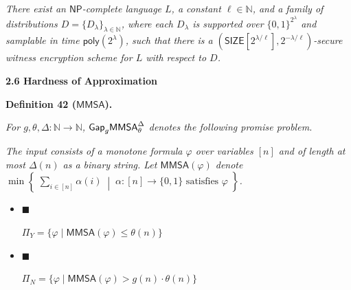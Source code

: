 \documentclass[10pt,a4paper]{article}
\begin{document}
\emph{There exist an ${\mathsf{NP}}$-complete language $L$, a constant $\ell\in\mathbb{N}$, and a family of distributions $D=\{D_{\lambda}\}_{\lambda\in\mathbb{N}}$, where each $D_{\lambda}$ is supported over $\{0,1\}^{2^{\lambda}}$ and samplable in time ${\mathsf{poly}}(2^{\lambda})$, such that there is a $({\mathsf{SIZE}}[2^{\lambda/\ell}],2^{-\lambda/\ell})$-secure witness encryption scheme for $L$ with respect to $D$.}\par







\par\medskip\noindent\textbf{
2.6 Hardness of Approximation}\par





\par\medskip\noindent\textbf{
\textbf{Definition 42}\textbf{ }(${\mathsf{MMSA}}$)\textbf{.}
}\par



\emph{For $g,\theta,\Delta:\mathbb{N}\to\mathbb{N}$, ${\sf Gap}_{g}{\mathsf{MMSA}}^{\Delta}_{\theta}$ denotes the following promise problem.}\par




\emph{The input consists of a monotone formula $\varphi$ over variables $[n]$ and of length at most $\Delta(n)$ as a binary string. Let ${\mathsf{MMSA}}(\varphi)$ denote $\min\left\{\;\sum_{i\in[n]}\alpha(i)\;\middle|\;\alpha:[n]\to\{0,1\}\text{ satisfies }\varphi\;\right\}$.}\par


\begin{itemize}


\item[] 
$\blacksquare$ 


$\Pi_{Y}=\{\varphi\mid{\mathsf{MMSA}}(\varphi)\leq\theta(n)\}$\emph{}\par





\item[] 
$\blacksquare$ 


$\Pi_{N}=\{\varphi\mid{\mathsf{MMSA}}(\varphi)>g(n)\cdot\theta(n)\}$\emph{}\par





\end{itemize}
\end{document}

